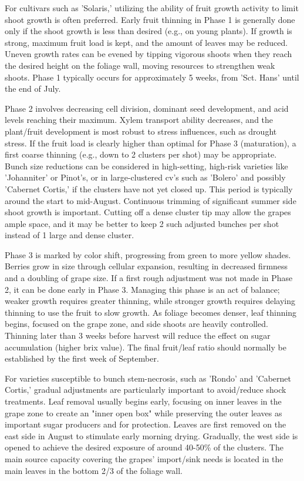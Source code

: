 \vspace{0.5em}
For cultivars such as 'Solaris,' utilizing the ability of fruit growth activity to limit shoot growth is often preferred. Early fruit thinning in Phase 1 is generally done only if the shoot growth is less than desired (e.g., on young plants). If growth is strong, maximum fruit load is kept, and the amount of leaves may be reduced. Uneven growth rates can be evened by tipping vigorous shoots when they reach the desired height on the foliage wall, moving resources to strengthen weak shoots. Phase 1 typically occurs for approximately 5 weeks, from 'Sct. Hans' until the end of July.

\vspace{0.5em}
Phase 2 involves decreasing cell division, dominant seed development, and acid levels reaching their maximum. Xylem transport ability decreases, and the plant/fruit development is most robust to stress influences, such as drought stress. If the fruit load is clearly higher than optimal for Phase 3 (maturation), a first coarse thinning (e.g., down to 2 clusters per shot) may be appropriate. Bunch size reductions can be considered in high-setting, high-risk varieties like 'Johanniter' or Pinot's, or in large-clustered cv's such as 'Bolero' and possibly 'Cabernet Cortis,' if the clusters have not yet closed up. This period is typically around the start to mid-August. Continuous trimming of significant summer side shoot growth is important. Cutting off a dense cluster tip may allow the grapes ample space, and it may be better to keep 2 such adjusted bunches per shot instead of 1 large and dense cluster.

\vspace{0.5em}
Phase 3 is marked by color shift, progressing from green to more yellow shades. Berries grow in size through cellular expansion, resulting in decreased firmness and a doubling of grape size. If a first rough adjustment was not made in Phase 2, it can be done early in Phase 3. Managing this phase is an act of balance; weaker growth requires greater thinning, while stronger growth requires delaying thinning to use the fruit to slow growth. As foliage becomes denser, leaf thinning begins, focused on the grape zone, and side shoots are heavily controlled. Thinning later than 3 weeks before harvest will reduce the effect on sugar accumulation (higher brix value). The final fruit/leaf ratio should normally be established by the first week of September.

\vspace{0.5em}
For varieties susceptible to bunch stem-necrosis, such as 'Rondo' and 'Cabernet Cortis,' gradual adjustments are particularly important to avoid/reduce shock treatments. Leaf removal usually begins early, focusing on inner leaves in the grape zone to create an "inner open box" while preserving the outer leaves as important sugar producers and for protection. Leaves are first removed on the east side in August to stimulate early morning drying. Gradually, the west side is opened to achieve the desired exposure of around 40-50\% of the clusters. The main source capacity covering the grapes' import/sink needs is located in the main leaves in the bottom 2/3 of the foliage wall.


